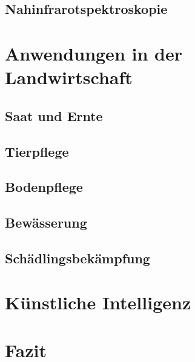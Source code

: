 \documentclass[a4paper,
			   11pt,
			   ngerman, 
			   ]{scrreprt}
\begin{document}
		\section{Nahinfrarotspektroskopie}
		
	
	\chapter{Anwendungen in der Landwirtschaft}
		\section{Saat und Ernte}
		
		\section{Tierpflege}
		
		\section{Bodenpflege}
			
		\section{Bewässerung}
			
		\section{Schädlingsbekämpfung}
		
	\chapter{Künstliche Intelligenz}
	
	\chapter{Fazit}
	
	\printbibliography
	\listoffigures
\end{document}
